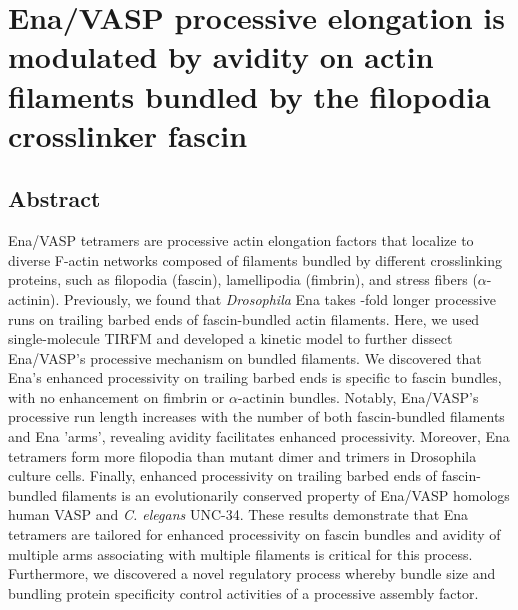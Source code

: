 
\chapter{Ena/VASP processive elongation is modulated by avidity on actin filaments bundled by the filopodia crosslinker fascin}\label{ch:ena}

\section[Abstract]{Abstract\footnotemark}
Ena/VASP tetramers are processive actin elongation factors that localize to diverse F-actin networks composed of filaments bundled by different crosslinking proteins, such as filopodia (fascin), lamellipodia (fimbrin), and stress fibers ($\alpha$-actinin). Previously, we found that \textit{Drosophila} Ena takes -fold longer processive runs on trailing barbed ends of fascin-bundled actin filaments. Here, we used single-molecule TIRFM and developed a kinetic model to further dissect Ena/VASP's processive mechanism on bundled filaments. We discovered that Ena's enhanced processivity on trailing barbed ends is specific to fascin bundles, with no enhancement on fimbrin or $\alpha$-actinin bundles. Notably, Ena/VASP's processive run length increases with the number of both fascin-bundled filaments and Ena 'arms', revealing avidity facilitates enhanced processivity. Moreover, Ena tetramers form more filopodia than mutant dimer and trimers in Drosophila culture cells. Finally, enhanced processivity on trailing barbed ends of fascin-bundled filaments is an evolutionarily conserved property of Ena/VASP homologs human VASP and \textit{C. elegans} UNC-34. These results demonstrate that Ena tetramers are tailored for enhanced processivity on fascin bundles and avidity of multiple arms associating with multiple filaments is critical for this process. Furthermore, we discovered a novel regulatory process whereby bundle size and bundling protein specificity control activities of a processive assembly factor.


